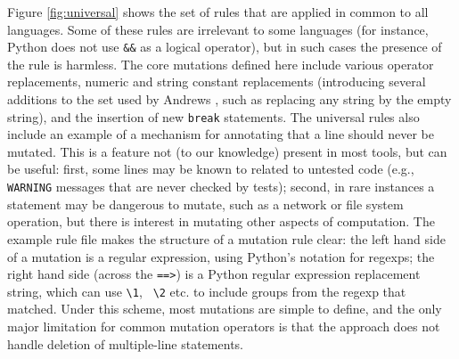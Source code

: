 Figure \ref{fig:universal} shows the set of rules that are applied in
common to all languages.  Some of these rules are irrelevant to some
languages (for instance, Python does not use {\tt \&\&} as a logical
operator), but in such cases the presence of the rule is harmless.  The
core mutations defined here include various operator replacements,
numeric and string constant replacements (introducing several
additions to the set used by Andrews \cite{mutant}, such as replacing
any string by the empty string), and the insertion of new {\tt break}
statements.  The universal rules also include an example of a
mechanism for annotating that a line should never be mutated.  This is
a feature not (to our knowledge) present in most tools, but can be
useful:  first, some lines may be known to related to untested code
(e.g., {\tt WARNING} messages that are never checked by tests);
second, in rare instances a statement may be dangerous to mutate, such
as a network or file system operation, but there is interest in
mutating other aspects of computation.  The example rule file makes
the structure of a mutation rule clear:  the left hand side of a
mutation is a regular expression, using Python's notation for regexps;
the right hand side (across the {\tt ==>}) is a Python regular
expression replacement string, which can use {\tt \textbackslash 1}, {\tt
  \textbackslash 2}
etc. to include groups from the regexp that matched.  Under this
scheme, most mutations are simple to define, and the only major
limitation for common mutation operators is that the approach does not
handle deletion of multiple-line statements.

